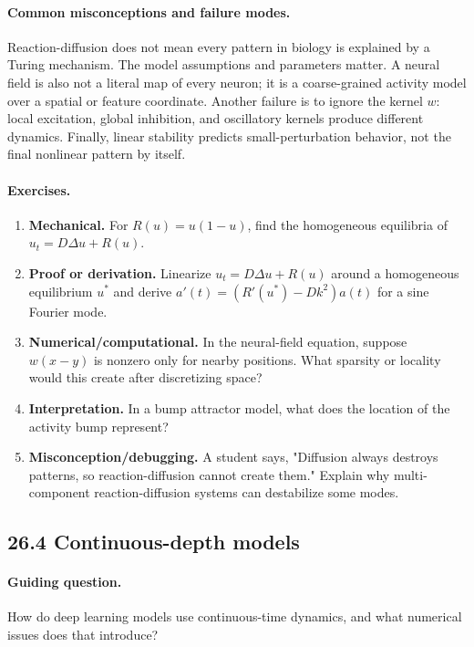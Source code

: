 \paragraph{Common misconceptions and failure modes.}
Reaction-diffusion does not mean every pattern in biology is explained by a Turing mechanism. The model assumptions and parameters matter. A neural field is also not a literal map of every neuron; it is a coarse-grained activity model over a spatial or feature coordinate. Another failure is to ignore the kernel \(w\): local excitation, global inhibition, and oscillatory kernels produce different dynamics. Finally, linear stability predicts small-perturbation behavior, not the final nonlinear pattern by itself.

\paragraph{Exercises.}
\begin{enumerate}[label=\textbf{26.3.\arabic*.}, leftmargin=*]
\item \textbf{Mechanical.} For \(R(u)=u(1-u)\), find the homogeneous equilibria of \(u_t=D\Delta u+R(u)\).
\item \textbf{Proof or derivation.} Linearize \(u_t=D\Delta u+R(u)\) around a homogeneous equilibrium \(u^*\) and derive \(a'(t)=(R'(u^*)-Dk^2)a(t)\) for a sine Fourier mode.
\item \textbf{Numerical/computational.} In the neural-field equation, suppose \(w(x-y)\) is nonzero only for nearby positions. What sparsity or locality would this create after discretizing space?
\item \textbf{Interpretation.} In a bump attractor model, what does the location of the activity bump represent?
\item \textbf{Misconception/debugging.} A student says, "Diffusion always destroys patterns, so reaction-diffusion cannot create them." Explain why multi-component reaction-diffusion systems can destabilize some modes.
\end{enumerate}

\subsection{26.4 Continuous-depth models}

\paragraph{Guiding question.}
How do deep learning models use continuous-time dynamics, and what numerical issues does that introduce?

